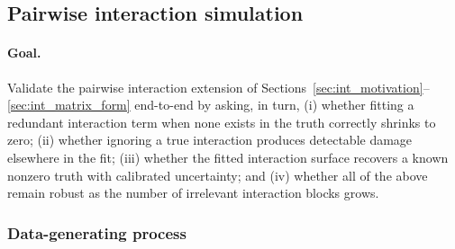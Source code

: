 %
%
%

\subsection{Pairwise interaction simulation}\label{sec:bayes_int_sim}

\paragraph{Goal.}
Validate the pairwise interaction extension of
Sections~\ref{sec:int_motivation}--\ref{sec:int_matrix_form} end-to-end by asking, in turn,
(i) whether fitting a redundant interaction term when none exists in the truth correctly
shrinks to zero; (ii) whether ignoring a true interaction produces detectable damage
elsewhere in the fit; (iii) whether the fitted interaction surface recovers a known nonzero
truth with calibrated uncertainty; and (iv) whether all of the above remain robust as the
number of irrelevant interaction blocks grows.

\subsubsection{Data-generating process}\label{sec:int_dgp}

